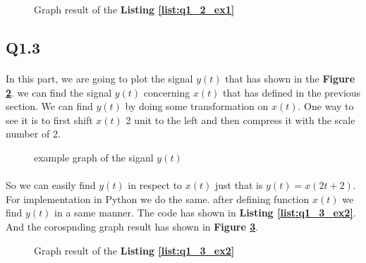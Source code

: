 \begin{figure}[H]
  \centering
  \scalebox{0.4}{}
  \caption{Graph result of the \textbf{Listing \ref{list:q1_2_ex1}}}
  \label{fig:Q1-2-ex1}
\end{figure}

\subsection{Q1.3}

\paragraph{}In this part, we are going to plot the 
signal $y(t)$ that has shown in the 
\textbf{Figure \ref{fig:ex2}}. we can find the signal 
$y(t)$ concerning $x(t)$ that has defined in the 
previous section. We can find $y(t)$ by doing some 
transformation on $x(t)$. One way to see it is to 
first shift $x(t)$ 2 unit to the left and then 
compress it with the scale number of 2.

\begin{figure}[H]
 \centering
{}
\caption{example graph of the siganl $y(t)$}
  \label{fig:ex2}
\end{figure}
\paragraph{}
So we can easily find $y(t)$ in respect to $x(t)$ 
just that is $y(t) = x(2t+2)$. For implementation 
in Python we do the same. after defining function 
$x(t)$ we find $y(t)$ in a same manner. The code 
has shown in \textbf{Listing \ref{list:q1_3_ex2}}. And the 
corospnding graph result has shown in 
\textbf{Figure \ref{fig:Q1-3-ex2}}.

\begin{figure}[H]
  \centering
  \scalebox{0.6}{}
  \caption{Graph result of the \textbf{Listing \ref{list:q1_3_ex2}}}
  \label{fig:Q1-3-ex2}
\end{figure}

